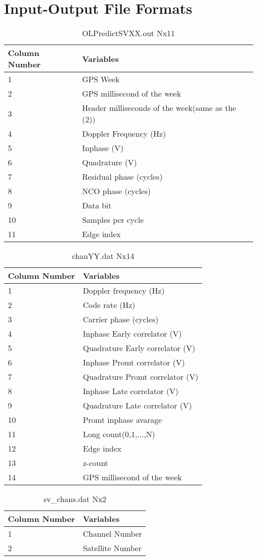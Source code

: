 \documentclass[12pt,letterpaper,oneside]{report}
\begin{document}
\section{Input-Output File Formats}
\begin{table}[H]
\caption{OLPredictSVXX.out   Nx11}
\centering
\begin{tabular}{l l}
\hline\hline
Column Number&Variables \\[0.5ex]
\hline
1&GPS Week\\
2&GPS millisecond of the week\\
3&Header milliseconds of the week(same as the (2))\\
4&Doppler Frequency (Hz)\\
5&Inphase (V)\\
6&Quadrature (V)\\
7&Residual phase (cycles)\\
8&NCO phase (cycles)\\
9&Data bit\\
10&Samples per cycle\\
11&Edge index\\
\hline
\end{tabular}
\label{tab:OLpredictOUT}
\end{table}
\begin{table}[H]
\caption{chanYY.dat   Nx14}
\centering
\begin{tabular}{l l}
\hline\hline
Column Number&Variables\\[0.5ex]
\hline
1&Doppler frequency (Hz)\\
2&Code rate (Hz)\\
3&Carrier phase (cycles)\\
4&Inphase Early correlator (V)\\
5&Quadrature Early correlator (V)\\
6&Inphase Promt correlator (V)\\
7&Quadrature Promt correlator (V)\\
8&Inphase Late correlator (V)\\
9&Quadrature Late correlator (V)\\
10&Promt inphase avarage\\
11&Long count(0,1,...,N)\\
12&Edge index\\
13&z-count\\
14&GPS millisecond of the week\\
\hline
\end{tabular}
\label{tab:chan}
\end{table}\newpage
\begin{table}[H]
\caption{sv\_chans.dat   Nx2}
\centering
\begin{tabular}{l l}
\hline\hline
Column Number&Variables\\[0.5ex]
\hline
1&Channel Number\\
2&Satellite Number\\
\hline
\end{tabular}
\label{tab:svchan}
\end{table}
\end{document}
